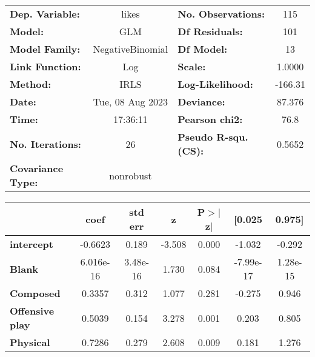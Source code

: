\begin{center}
\begin{tabular}{lclc}
\toprule
\textbf{Dep. Variable:}         &      likes       & \textbf{  No. Observations:  } &      115    \\
\textbf{Model:}                 &       GLM        & \textbf{  Df Residuals:      } &      101    \\
\textbf{Model Family:}          & NegativeBinomial & \textbf{  Df Model:          } &       13    \\
\textbf{Link Function:}         &       Log        & \textbf{  Scale:             } &    1.0000   \\
\textbf{Method:}                &       IRLS       & \textbf{  Log-Likelihood:    } &   -166.31   \\
\textbf{Date:}                  & Tue, 08 Aug 2023 & \textbf{  Deviance:          } &    87.376   \\
\textbf{Time:}                  &     17:36:11     & \textbf{  Pearson chi2:      } &     76.8    \\
\textbf{No. Iterations:}        &        26        & \textbf{  Pseudo R-squ. (CS):} &   0.5652    \\
\textbf{Covariance Type:}       &    nonrobust     & \textbf{                     } &             \\
\bottomrule
\end{tabular}
\begin{tabular}{lcccccc}
                                & \textbf{coef} & \textbf{std err} & \textbf{z} & \textbf{P$> |$z$|$} & \textbf{[0.025} & \textbf{0.975]}  \\
\midrule
\textbf{intercept}              &      -0.6623  &        0.189     &    -3.508  &         0.000        &       -1.032    &       -0.292     \\
\textbf{Blank}                  &    6.016e-16  &     3.48e-16     &     1.730  &         0.084        &    -7.99e-17    &     1.28e-15     \\
\textbf{Composed}               &       0.3357  &        0.312     &     1.077  &         0.281        &       -0.275    &        0.946     \\
\textbf{Offensive play}         &       0.5039  &        0.154     &     3.278  &         0.001        &        0.203    &        0.805     \\
\textbf{Physical}               &       0.7286  &        0.279     &     2.608  &         0.009        &        0.181    &        1.276     \\

\end{tabular}
\end{center}
